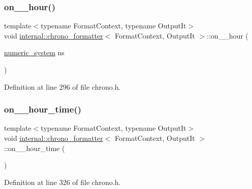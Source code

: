 \subsubsection{\texorpdfstring{on\+\_\+\_\+hour()}{on\_12\_hour()}}
{\footnotesize\ttfamily template$<$typename Format\+Context, typename Output\+It$>$ \\
void \hyperlink{structinternal_1_1chrono__formatter}{internal\+::chrono\+\_\+formatter}$<$ Format\+Context, Output\+It $>$\+::on\+\_\+\_\+hour (\begin{DoxyParamCaption}\item[{\hyperlink{namespaceinternal_a16e2a1195ca0f5beab658685f71df86b}{numeric\+\_\+system}}]{ns }\end{DoxyParamCaption})\hspace{0.3cm}{\ttfamily [inline]}}



Definition at line 296 of file chrono.\+h.

\mbox{\label{structinternal_1_1chrono__formatter_a6e42531597b2137916865a2a4ebb557e}} 
\subsubsection{\texorpdfstring{on\+\_\+\_\+hour\+\_\+time()}{on\_12\_hour\_time()}}
{\footnotesize\ttfamily template$<$typename Format\+Context, typename Output\+It$>$ \\
void \hyperlink{structinternal_1_1chrono__formatter}{internal\+::chrono\+\_\+formatter}$<$ Format\+Context, Output\+It $>$\+::on\+\_\+\_\+hour\+\_\+time (\begin{DoxyParamCaption}{ }\end{DoxyParamCaption})\hspace{0.3cm}{\ttfamily [inline]}}



Definition at line 326 of file chrono.\+h.

\mbox{\label{structinternal_1_1chrono__formatter_a7aca4b4319e557806c9461efd2c4eaf4}} 
